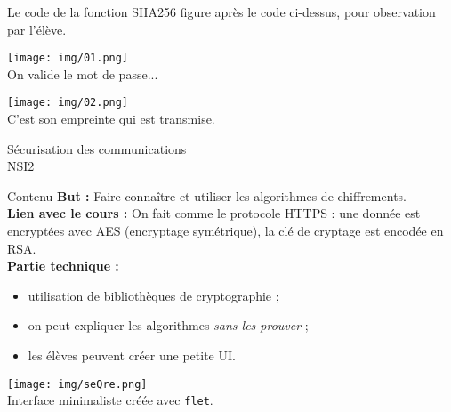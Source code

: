 \documentclass[12pt]{beamer}
\begin{document}
\begin{frame}
    Le code de la fonction SHA256 figure après le code ci-dessus, pour observation par l'élève.\pause


\begin{center}
    \texttt{[image: img/01.png]}\\
    On valide le mot de passe...\\[2em]\pause@

    \texttt{[image: img/02.png]}\\
    C'est son empreinte qui est transmise.

\end{center}

\end{frame}
\begin{frame}[standout]
    \begin{center}
        \Huge
        Sécurisation des communications\\
        NSI2
    \end{center}
\end{frame}


\begin{frame}{Contenu}\pause
\textbf{But :} Faire connaître et utiliser les algorithmes de chiffrements.\pause\\

\textbf{Lien avec le cours :} On fait comme le protocole HTTPS : une donnée est encryptées avec AES (encryptage symétrique), la clé de cryptage est encodée en RSA.\pause\\

\textbf{Partie technique :}\pause
\begin{itemize}
    \item utilisation de bibliothèques de cryptographie ;\pause
    \item on peut expliquer les algorithmes \textit{sans les prouver} ;
    \item les élèves peuvent créer une petite UI.\pause
\end{itemize}
\end{frame}

\begin{frame}
    \begin{center}
        \texttt{[image: img/seQre.png]}\\

        Interface minimaliste créée avec \texttt{flet}.
        \end{center}     
\end{frame}
\end{document}
